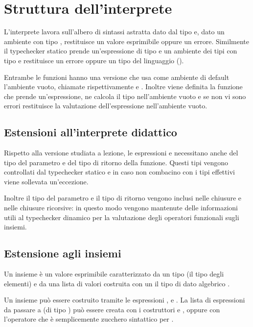 \section{Struttura dell'interprete}

L'interprete  lavora sull'albero di sintassi astratta dato dal tipo  e, dato un ambiente con tipo , restituisce un valore esprimibile  oppure un errore. Similmente il typechecker statico  prende un'espressione di tipo  e un ambiente dei tipi con tipo  e restituisce un errore oppure un tipo del linguaggio ().

Entrambe le funzioni hanno una versione che usa come ambiente di default l'ambiente vuoto, chiamate rispettivamente  e . Inoltre viene definita la funzione  che prende un'espressione, ne calcola il tipo nell'ambiente vuoto e se non vi sono errori restituisce la valutazione dell'espressione nell'ambiente vuoto.

\subsection*{Estensioni all'interprete didattico}

Rispetto alla versione studiata a lezione, le espressioni  e  necessitano anche del tipo del parametro e del tipo di ritorno della funzione. Questi tipi vengono controllati dal typechecker statico e in caso non combacino con i tipi effettivi viene sollevata un'eccezione.

Inoltre il tipo del parametro e il tipo di ritorno vengono inclusi nelle chiusure e nelle chiusure ricorsive: in questo modo vengono mantenute delle informazioni utili al typechecker dinamico per la valutazione degli operatori funzionali sugli insiemi.

\subsection*{Estensione agli insiemi}

Un insieme è un valore esprimibile caratterizzato da un tipo (il tipo degli elementi) e da una lista di valori costruita con un il tipo di dato algebrico .

Un insieme può essere costruito tramite le espressioni ,  e . La lista di espressioni da passare a  (di tipo ) può essere creata con i costruttori  e , oppure con l'operatore  che è semplicemente zucchero sintattico per . 

